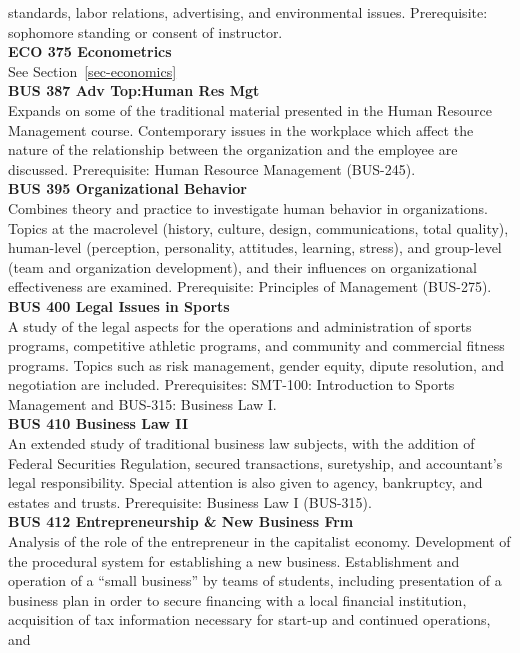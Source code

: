 \documentclass[
  letterpaper,
]{scrbook}
\begin{document}
standards, labor relations, advertising, and environmental issues.
Prerequisite: sophomore standing or consent of instructor.\\
\textbf{ECO 375 Econometrics}\\
See Section~\ref{sec-economics}\\
\textbf{BUS 387 Adv Top:Human Res Mgt}\\
Expands on some of the traditional material presented in the Human
Resource Management course. Contemporary issues in the workplace which
affect the nature of the relationship between the organization and the
employee are discussed. Prerequisite: Human Resource Management
(BUS-245).\\
\textbf{BUS 395 Organizational Behavior}\\
Combines theory and practice to investigate human behavior in
organizations. Topics at the macrolevel (history, culture, design,
communications, total quality), human-level (perception, personality,
attitudes, learning, stress), and group-level (team and organization
development), and their influences on organizational effectiveness are
examined. Prerequisite: Principles of Management (BUS-275).\\
\textbf{BUS 400 Legal Issues in Sports}\\
A study of the legal aspects for the operations and administration of
sports programs, competitive athletic programs, and community and
commercial fitness programs. Topics such as risk management, gender
equity, dipute resolution, and negotiation are included. Prerequisites:
SMT-100: Introduction to Sports Management and BUS-315: Business Law
I.\\
\textbf{BUS 410 Business Law II}\\
An extended study of traditional business law subjects, with the
addition of Federal Securities Regulation, secured transactions,
suretyship, and accountant's legal responsibility. Special attention is
also given to agency, bankruptcy, and estates and trusts. Prerequisite:
Business Law I (BUS-315).\\
\textbf{BUS 412 Entrepreneurship \& New Business Frm}\\
Analysis of the role of the entrepreneur in the capitalist economy.
Development of the procedural system for establishing a new business.
Establishment and operation of a ``small business'' by teams of
students, including presentation of a business plan in order to secure
financing with a local financial institution, acquisition of tax
information necessary for start-up and continued operations, and
\end{document}
